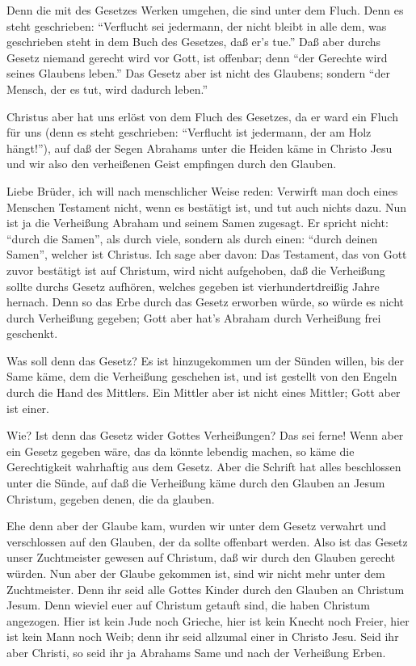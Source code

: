  Denn die mit des Gesetzes Werken umgehen, die sind unter
dem Fluch. Denn es steht geschrieben: ``Verflucht sei jedermann, der
nicht bleibt in alle dem, was geschrieben steht in dem Buch des
Gesetzes, daß er's tue.''  Daß aber durchs Gesetz niemand
gerecht wird vor Gott, ist offenbar; denn ``der Gerechte wird seines
Glaubens leben.''  Das Gesetz aber ist nicht des Glaubens;
sondern ``der Mensch, der es tut, wird dadurch leben.''

 Christus aber hat uns erlöst von dem Fluch des Gesetzes,
da er ward ein Fluch für uns (denn es steht geschrieben: ``Verflucht ist
jedermann, der am Holz hängt!''),  auf daß der Segen
Abrahams unter die Heiden käme in Christo Jesu und wir also den
verheißenen Geist empfingen durch den Glauben.

 Liebe Brüder, ich will nach menschlicher Weise reden:
Verwirft man doch eines Menschen Testament nicht, wenn es bestätigt ist,
und tut auch nichts dazu.  Nun ist ja die Verheißung
Abraham und seinem Samen zugesagt. Er spricht nicht: ``durch die
Samen'', als durch viele, sondern als durch einen: ``durch deinen
Samen'', welcher ist Christus.  Ich sage aber davon: Das
Testament, das von Gott zuvor bestätigt ist auf Christum, wird nicht
aufgehoben, daß die Verheißung sollte durchs Gesetz aufhören, welches
gegeben ist vierhundertdreißig Jahre hernach.  Denn so das
Erbe durch das Gesetz erworben würde, so würde es nicht durch Verheißung
gegeben; Gott aber hat's Abraham durch Verheißung frei geschenkt.

 Was soll denn das Gesetz? Es ist hinzugekommen um der
Sünden willen, bis der Same käme, dem die Verheißung geschehen ist, und
ist gestellt von den Engeln durch die Hand des Mittlers. 
Ein Mittler aber ist nicht eines Mittler; Gott aber ist einer.

 Wie? Ist denn das Gesetz wider Gottes Verheißungen? Das
sei ferne! Wenn aber ein Gesetz gegeben wäre, das da könnte lebendig
machen, so käme die Gerechtigkeit wahrhaftig aus dem Gesetz.
 Aber die Schrift hat alles beschlossen unter die Sünde,
auf daß die Verheißung käme durch den Glauben an Jesum Christum, gegeben
denen, die da glauben.

 Ehe denn aber der Glaube kam, wurden wir unter dem Gesetz
verwahrt und verschlossen auf den Glauben, der da sollte offenbart
werden.  Also ist das Gesetz unser Zuchtmeister gewesen auf
Christum, daß wir durch den Glauben gerecht würden.  Nun
aber der Glaube gekommen ist, sind wir nicht mehr unter dem
Zuchtmeister.  Denn ihr seid alle Gottes Kinder durch den
Glauben an Christum Jesum.  Denn wieviel euer auf Christum
getauft sind, die haben Christum angezogen.  Hier ist kein
Jude noch Grieche, hier ist kein Knecht noch Freier, hier ist kein Mann
noch Weib; denn ihr seid allzumal einer in Christo Jesu. 
Seid ihr aber Christi, so seid ihr ja Abrahams Same und nach der
Verheißung Erben.

